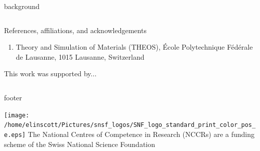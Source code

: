 \documentclass{beamer}
\begin{document}
\begin{frame}[t]{}
\begin{beamercolorbox}[ht=0.675\paperheight,wd=\textwidth]{background}
\begin{columns}[t]
\begin{column}{0.57\linewidth}
                \begin{block}{References, affiliations, and acknowledgements}
                    \begin{minipage}{0.45\textwidth}
                        \AtNextBibliography{\tiny}
                        \printbibliography
                    \end{minipage}
                    \begin{minipage}{0.575\textwidth}
                        \tiny
                        \begin{enumerate}
                            \item Theory and Simulation of Materials (THEOS), \'Ecole Polytechnique F\'ed\'erale de Lausanne, 1015 Lausanne, Switzerland
                        \end{enumerate}
                        \vspace{1em}
                        This work was supported by...
                    \end{minipage}


                \end{block}
            \end{column}

        \end{columns}

    \end{beamercolorbox}

    \begin{beamercolorbox}[wd=\textwidth,sep=1em]{footer}
        \begin{minipage}{0.55\textwidth}
            \texttt{[image: /home/elinscott/Pictures/snsf\_logos/SNF\_logo\_standard\_print\_color\_pos\_e.eps]}
            \hspace{0.01\columnwidth}
            \tiny The National Centres of Competence in Research (NCCRs) are a funding scheme of the Swiss National Science Foundation
        \end{minipage}
        \hfill
    \end{beamercolorbox}

\end{frame}
\end{document}
